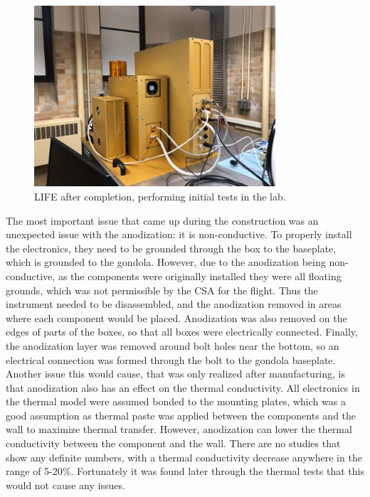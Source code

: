 \begin{figure}
    \centering
    \includegraphics[width=0.8\textwidth]{chap3_images/LIFE_in_lab.jpg}
    \caption{LIFE after completion, performing initial tests in the lab.}
    \label{fig:LIFE_after_build}
\end{figure}

The most important issue that came up during the construction was an unexpected issue with the anodization: it is non-conductive. To properly install the electronics, they need to be grounded through the box to the baseplate, which is grounded to the gondola. However, due to the anodization being non-conductive, as the components were originally installed they were all floating grounds, which was not permissible by the CSA for the flight. Thus the instrument needed to be disassembled, and the anodization removed in areas where each component would be placed. Anodization was also removed on the edges of parts of the boxes, so that all boxes were electrically connected. Finally, the anodization layer was removed around bolt holes near the bottom, so an electrical connection was formed through the bolt to the gondola baseplate. Another issue this would cause, that was only realized after manufacturing, is that anodization also has an effect on the thermal conductivity. All electronics in the thermal model were assumed bonded to the mounting plates, which was a good assumption as thermal paste was applied between the components and the wall to maximize thermal transfer. However, anodization can lower the thermal conductivity between the component and the wall. There are no studies that show any definite numbers, with a thermal conductivity decrease anywhere in the range of 5-20\%. Fortunately it was found later through the thermal tests that this would not cause any issues.

